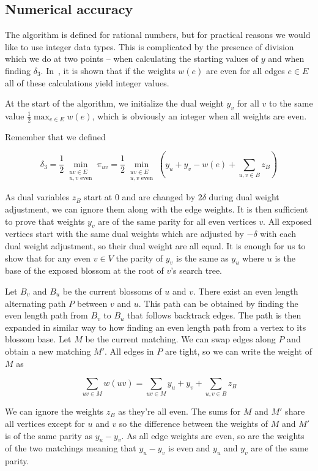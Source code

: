 \subsection{Numerical accuracy}

The algorithm is defined for rational numbers, but for practical reasons we would like to use integer data types. This is complicated by the presence of division which we do at two points – when calculating the starting values of $y$ and when finding $\delta_3$. In~\cite{gabow1974implementation}, it is shown that if the weights $w(e)$ are even for all edges $e\in E$ all of these calculations yield integer values.

At the start of the algorithm, we initialize the dual weight $y_v$ for all $v$ to the same value $\frac{1}{2}\max_{e \in E} w(e)$, which is obviously an integer when all weights are even.

Remember that we defined

\[\delta_3=\frac{1}{2}\min_{\substack{uv\in E \\ \text{$u, v$ even}}} \pi_{uv} = \frac{1}{2}\min_{\substack{uv\in E \\ \text{$u, v$ even}}} \left(y_u + y_v - w(e) + \sum_{u, v \in B} z_B\right)\] 

As dual variables $z_B$ start at $0$ and are changed by $2\delta$ during dual weight adjustment, we can ignore them along with the edge weights. It is then sufficient to prove that weights $y_v$ are of the same parity for all even vertices $v$. All exposed vertices start with the same dual weights which are adjusted by $-\delta$ with each dual weight adjustment, so their dual weight are all equal. It is enough for us to show that for any even $v \in V$ the parity of $y_v$ is the same as $y_u$ where $u$ is the base of the exposed blossom at the root of $v$'s search tree. 

Let $B_v$ and $B_u$ be the current blossoms of $u$ and $v$. There exist an even length alternating path $P$ between $v$ and $u$. This path can be obtained by finding the even length path from $B_v$ to $B_u$ that follows backtrack edges. The path is then expanded in similar way to how finding an even length path from a vertex to its blossom base. Let $M$ be the current matching. We can swap edges along $P$ and obtain a new matching $M'$. All edges in $P$ are tight, so we can write the weight of $M$ as

\[\sum_{uv \in M} w(uv) = \sum_{uv \in M} y_u + y_v + \sum_{u, v \in B} z_B\]

We can ignore the weights $z_B$ as they're all even. The sums for $M$ and $M'$ share all vertices except for $u$ and $v$ so the difference between the weights of $M$ and $M'$ is of the same parity as $y_u - y_v$. As all edge weights are even, so are the weights of the two matchings meaning that $y_u - y_v$ is even and $y_u$ and $y_v$ are of the same parity.

